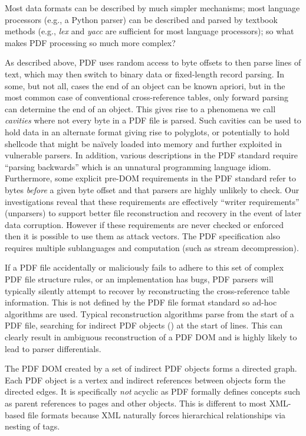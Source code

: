 Most data formats can be described by much simpler mechanisms;
most language processors (e.g., a Python parser) can be described and parsed by
textbook methods (e.g., \emph{lex} and \emph{yacc} are sufficient for
most language processors);
so what makes PDF processing so much more complex?

As described above, PDF uses random access to byte offsets to then parse lines of text,
which may then switch to binary data or fixed-length record parsing. 
In some, but not all, cases the end of an object can be known apriori, but in the most common case 
of conventional cross-reference tables, only forward parsing can determine the end of an object. 
This gives rise to a phenomena we call \emph{cavities} where not every byte in a PDF file is parsed.
Such cavities can be used to hold data in an alternate format giving rise to polyglots, or potentially
to hold shellcode that might be na\"ively loaded into memory and further exploited 
in vulnerable parsers.
In addition, various descriptions in the PDF standard require ``parsing backwards'' which is 
an unnatural programming language idiom. Furthermore, some explicit pre-DOM requirements
in the PDF standard
refer to bytes \emph{before} a given byte offset and that parsers are highly unlikely to check. 
Our investigations reveal that these requirements are effectively ``writer requirements'' (unparsers) to
support better file reconstruction and recovery in the event of later data corruption. 
However if these requirements are never checked or enforced then it is possible to use them as attack
vectors.  
The PDF specification also requires multiple
sublanguages and computation (such as stream decompression).

If a PDF file accidentally or maliciously fails to adhere to this set of complex PDF file structure
rules, or an implementation has bugs, PDF parsers will typically silently attempt to recover
by reconstructing the cross-reference table information. 
This is not defined by the PDF file format standard so 
ad-hoc algorithms are used. Typical reconstruction algorithms parse from the start of a PDF 
file, searching for indirect PDF objects () at the start of lines. This can clearly result
in ambiguous reconstruction of a PDF DOM and is highly likely to lead to parser differentials.

The PDF DOM created by a set of indirect PDF objects forms a directed graph. 
Each PDF object is a vertex and indirect references between objects form the directed edges. It is 
specifically \emph{not} acyclic as PDF formally defines concepts such as parent references to 
pages and other objects. This is different to most XML-based file formats because XML naturally 
forces hierarchical relationships via nesting of tags.

